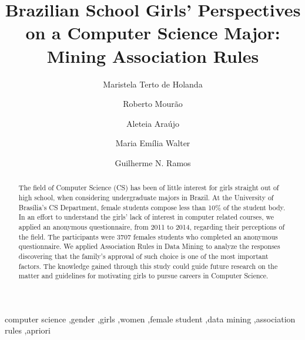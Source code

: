 \documentclass[preprint,12pt]{elsarticle}%
\begin{document}
\begin{frontmatter}



\title{Brazilian School Girls' Perspectives on a Computer Science Major: Mining Association Rules}

\author{Maristela Terto de Holanda}%
%
%
\author{Roberto Mourão}%
\author{Aleteia Araújo}%
\author{Maria Emília Walter}%
\author{Guilherme N. Ramos}%



\address{Department of Computer Science, University of Brasília, Brasília, Brazil}%

\begin{abstract}
The field of Computer Science (CS) has been of little interest for girls straight out of high school, when considering undergraduate majors in Brazil. At the University of Brasília’s CS Department, female students compose less than 10\% of the student body. In an effort to understand the girls’ lack of interest in computer related courses, we applied an anonymous questionnaire, from 2011 to 2014, regarding their perceptions of the field.  The participants were 3707 females students who completed an anonymous questionnaire. We applied Association Rules in Data Mining to analyze the responses discovering that the family's approval of such choice is one of the most important factors. The knowledge gained through this study could guide future research on the matter and guidelines for motivating girls to pursue careers in Computer Science.
\end{abstract}

\begin{keyword}
computer science \sep gender \sep girls \sep women \sep female student \sep data mining \sep association rules \sep apriori%


\end{keyword}

\end{frontmatter}
\end{document}
